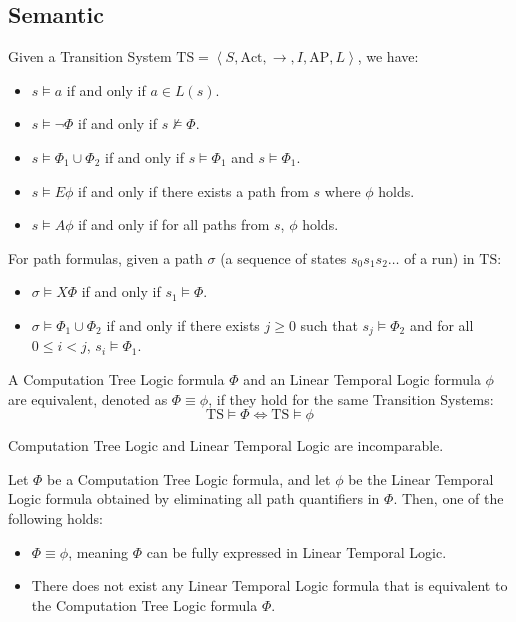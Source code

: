 \subsection{Semantic}
Given a Transition System $\text{TS}=\left\langle S, \text{Act}, \rightarrow, I,\text{AP}, L\right\rangle$, we have: 
\begin{itemize}
    \item $s \models a$ if and only if $a \in L(s)$. 
    \item $s \models \lnot \Phi$ if and only if $s \not\models \Phi$.
    \item $s \models \Phi_1 \cup \Phi_2$ if and only if $s \models \Phi_1$ and $s \models \Phi_1$.
    \item $s \models E\phi$ if and only if there exists a path from $s$ where $\phi$ holds. 
    \item $s \models A\phi$  if and only if for all paths from $s$, $\phi$ holds. 
\end{itemize}
\noindent For path formulas, given a path $\sigma$ (a sequence of states $s_0s_1s_2\dots$ of a run) in $\text{TS}$: 
\begin{itemize}
    \item $\sigma \models X\Phi$ if and only if $s_1 \models \Phi$.
    \item $\sigma \models \Phi_1 \cup \Phi_2$ if and only if there exists $j\geq 0$ such that $s_j \models \Phi_2$ and for all $0 \leq i < j$, $s_i \models \Phi_1$.
\end{itemize}
\noindent A Computation Tree Logic formula $\Phi$ and an Linear Temporal Logic formula $\phi$ are equivalent, denoted as $\Phi\equiv\phi$, if they hold for the same Transition Systems: 
\[\text{TS} \models \Phi \Leftrightarrow \text{TS} \models \phi\]
\begin{theorem}
    Computation Tree Logic and Linear Temporal Logic are incomparable.
\end{theorem}
\begin{theorem}
    Let $\Phi$ be a Computation Tree Logic formula, and let $\phi$ be the Linear Temporal Logic formula obtained by eliminating all path quantifiers in $\Phi$. 
    Then, one of the following holds:
    \begin{itemize}
        \item $\Phi\equiv\phi$, meaning $\Phi$ can be fully expressed in Linear Temporal Logic.
        \item There does not exist any Linear Temporal Logic formula that is equivalent to the Computation Tree Logic formula $\Phi$.
    \end{itemize}
\end{theorem}

